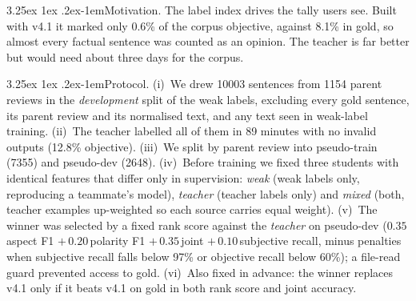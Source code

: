 \documentclass[10pt,twocolumn,a4paper]{article}
\makeatletter
\renewcommand\paragraph{\@startsection{paragraph}{4}{\parindent}%
  {3.25ex \@plus 1ex \@minus .2ex}{-1em}{\normalfont\normalsize\bfseries}}
\makeatother
\begin{document}
\paragraph{Motivation.} The label index drives the tally users see. Built with v4.1 it marked only 0.6\% of the corpus
objective, against 8.1\% in gold, so almost every factual sentence was counted as an opinion. The teacher is far better
but would need about three days for the corpus.

\paragraph{Protocol.} (i)~We drew \num{10003} sentences from \num{1154} parent reviews in the \emph{development} split of
the weak labels, excluding every gold sentence, its parent review and its normalised text, and any text seen in
weak-label training. (ii)~The teacher labelled all of them in 89 minutes with no invalid outputs (12.8\% objective).
(iii)~We split by parent review into pseudo-train (\num{7355}) and pseudo-dev (\num{2648}). (iv)~Before training we fixed
three students with identical features that differ only in supervision: \emph{weak} (weak labels only, reproducing a
teammate's model), \emph{teacher} (teacher labels only) and \emph{mixed} (both, teacher examples up-weighted so each
source carries equal weight). (v)~The winner was selected by a fixed rank score against the \emph{teacher} on
pseudo-dev ($0.35\,$aspect F1 $+\,0.20\,$polarity F1 $+\,0.35\,$joint $+\,0.10\,$subjective recall, minus penalties
when subjective recall falls below 97\% or objective recall below 60\%); a file-read guard prevented access to gold. (vi)~Also fixed in advance: the winner replaces v4.1 only if it
beats v4.1 on gold in both rank score and joint accuracy.
\end{document}
